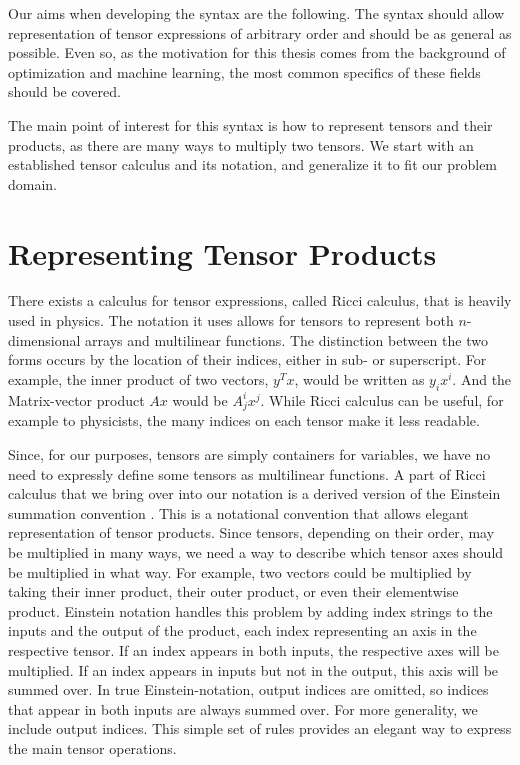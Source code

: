 \documentclass[12pt, a4paper]{report}
\begin{document}
Our aims when developing the syntax are the following.
The syntax should allow representation of tensor expressions of arbitrary order and should be as general as possible.
Even so, as the motivation for this thesis comes from the background of optimization and machine learning, the most common specifics of these fields should be covered.

The main point of interest for this syntax is how to represent tensors and their products, as there are many ways to multiply two tensors.
We start with an established tensor calculus and its notation, and generalize it to fit our problem domain.

\section{Representing Tensor Products}
There exists a calculus for tensor expressions, called Ricci calculus, that is heavily used in physics. \cite{ricci}
The notation it uses allows for tensors to represent both $n$-dimensional arrays and multilinear functions.
The distinction between the two forms occurs by the location of their indices, either in sub- or superscript.
For example, the inner product of two vectors, $y^Tx$, would be written as $y_ix^i$. And the Matrix-vector product $Ax$ would be $A^i_jx^j$.
While Ricci calculus can be useful, for example to physicists, the many indices on each tensor make it less readable.

Since, for our purposes, tensors are simply containers for variables, we have no need to expressly define some tensors as multilinear functions.
A part of Ricci calculus that we bring over into our notation is a derived version of the Einstein summation convention \cite{einstein}.
This is a notational convention that allows elegant representation of tensor products.
Since tensors, depending on their order, may be multiplied in many ways, we need a way to describe which tensor axes should be multiplied in what way.
For example, two vectors could be multiplied by taking their inner product, their outer product, or even their elementwise product.
Einstein notation handles this problem by adding index strings to the inputs and the output of the product, each index representing an axis in the respective tensor.
If an index appears in both inputs, the respective axes will be multiplied.
If an index appears in inputs but not in the output, this axis will be summed over.
In true Einstein-notation, output indices are omitted, so indices that appear in both inputs are always summed over. 
For more generality, we include output indices.
This simple set of rules provides an elegant way to express the main tensor operations.
\end{document}
